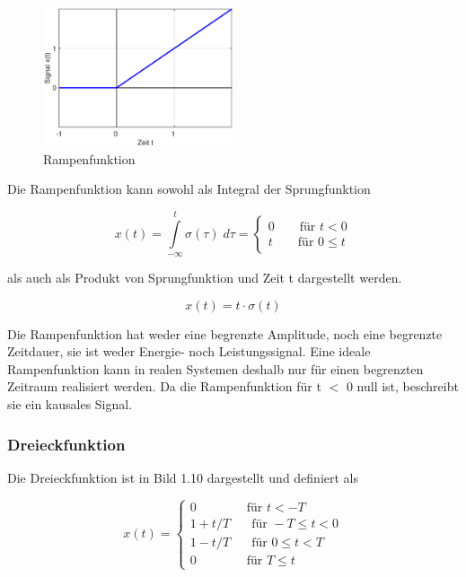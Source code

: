 \begin{figure}[ht]
  \centerline{\includegraphics[width=0.5\textwidth]{Kapitel1/Bilder/image9}}
  \caption{Rampenfunktion}
  \label{fig:Rampenfunktion}
\end{figure}


\noindent Die Rampenfunktion kann sowohl als Integral der Sprungfunktion 

\begin{equation}\label{eq:onethirtytwo}
x\left(t\right)=\int\limits _{-\infty }^{t}\sigma \left(\tau \right) \;d\tau = \left\{\begin{array}{l} {0\qquad \text{für } t < 0} \\ 
{t\qquad \text{für } 0\le t} 
\end{array}\right.
\end{equation}


\noindent als auch als Produkt von Sprungfunktion und Zeit t dargestellt werden.

\begin{equation}\label{eq:onethirtythree}
x\left(t\right)=t\cdot \sigma \left(t\right)
\end{equation}


\noindent Die Rampenfunktion hat weder eine begrenzte Amplitude, noch eine begrenzte Zeitdauer, sie ist weder Energie- noch Leistungssignal. Eine ideale Rampenfunktion kann in realen Systemen deshalb nur f\"{u}r einen begrenzten Zeitraum realisiert werden. Da die Rampenfunktion f\"{u}r t $\mathrm{<}$ 0 null ist, beschreibt sie ein kausales Signal.


\subsubsection{ Dreieckfunktion}

\noindent Die Dreieckfunktion ist in Bild 1.10 dargestellt und definiert als

\begin{equation}\label{eq:onethirtyfour}
x\left(t\right)=\left\{\begin{array}{l} 
{0 \qquad \qquad \text{für } t<-T} \\ 
{1+t/T  \quad \,\: \text{ für } -T\le t<0} \\ 
{1-t/T  \quad \,\: \text{ für }  0\le t<T} \\ 
{0 \qquad \qquad \text{für } T\le t} 
\end{array}\right.
\end{equation}



